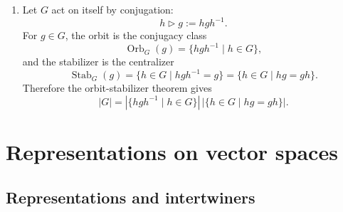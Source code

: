 {\begin{enumerate}[label=\textbf{\alph*)}]
        Let \(\operatorname{Rot}\leq G\) be the subgroup of orientation
        preserving symmetries. The determinant gives a surjective homomorphism
        \[
            \det : G \to \{\pm 1\} \cong \mathbb{Z}_2
        \]
        with kernel \(\operatorname{Rot}\). Therefore
        \[
            |G| = 2|\operatorname{Rot}|,
            \qquad
            |\operatorname{Rot}| = 24.
        \]

        There are four body diagonals in the cube. If \(D\) is the set of these
        diagonals, then rotations act on \(D\), giving a homomorphism
        \[
            \operatorname{Rot}
            \to
            \operatorname{Aut}(D)
            \cong
            S_4.
        \]
        This action is faithful: a rotation fixing all four body diagonals must
        be the identity. Since both groups have order \(24\), we get
        \[
            \operatorname{Rot} \cong S_4.
        \]

        Finally, the map
        \[
            s : \mathbb{Z}_2 \to G,
            \qquad
            -1 \mapsto -I_3
        \]
        is a section of \(\det\), and \(-I_3\) commutes with every symmetry of
        the cube. Hence
        \[
            G \cong S_4 \times \mathbb{Z}_2.
        \]

        \item Let \(G\) act on itself by conjugation:
        \[
            h \triangleright g := hgh^{-1}.
        \]
        For \(g \in G\), the orbit is the conjugacy class
        \[
            \operatorname{Orb}_G(g)
            =
            \{ hgh^{-1} \mid h \in G \},
        \]
        and the stabilizer is the centralizer
        \[
            \operatorname{Stab}_G(g)
            =
            \{ h \in G \mid hgh^{-1} = g \}
            =
            \{ h \in G \mid hg = gh \}.
        \]
        Therefore the orbit-stabilizer theorem gives
        \[
            |G|
            =
            |\{ hgh^{-1} \mid h \in G \}|\,
            |\{ h \in G \mid hg = gh \}|.
        \]
    \end{enumerate}
}

\section{Representations on vector spaces}

\subsection{Representations and intertwiners}

